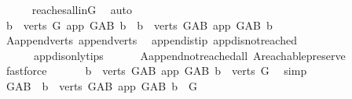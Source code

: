 \begin{isabellebody}
\ \ \ \ \isamarkupfalse%
\ reaches{\isacharunderscore}{\kern0pt}all{\isacharunderscore}{\kern0pt}in{\isacharunderscore}{\kern0pt}G\ \isamarkupfalse%
\ auto\isanewline
\ \ \isamarkupfalse%
\ \isamarkupfalse%
\ {\isachardoublequoteopen}{\isacharbraceleft}{\kern0pt}b\ {\isasymin}\ verts\ G{\isachardot}{\kern0pt}\ app\ {\isasymrightarrow}\isactrlsup {\isacharplus}{\kern0pt}\isactrlbsub G{\isacharunderscore}{\kern0pt}AB\isactrlesub \ b{\isacharbraceright}{\kern0pt}\ {\isacharequal}{\kern0pt}\ {\isacharbraceleft}{\kern0pt}b\ {\isasymin}\ verts\ G{\isacharunderscore}{\kern0pt}AB{\isachardot}{\kern0pt}\ app\ {\isasymrightarrow}\isactrlsup {\isacharplus}{\kern0pt}\isactrlbsub G{\isacharunderscore}{\kern0pt}AB\isactrlesub \ b{\isacharbraceright}{\kern0pt}{\isachardoublequoteclose}\isanewline
\ \ \ \ \isamarkupfalse%
\ A{}{\isachardot}{\kern0pt}append{\isacharunderscore}{\kern0pt}verts\ append{\isacharunderscore}{\kern0pt}verts\ \isamarkupfalse%
\ append{\isacharunderscore}{\kern0pt}is{\isacharunderscore}{\kern0pt}tip\ app{\isacharunderscore}{\kern0pt}dis{\isacharunderscore}{\kern0pt}not{\isacharunderscore}{\kern0pt}reached\isanewline
\ \ \ \ \ \ app{\isacharunderscore}{\kern0pt}dis{\isacharunderscore}{\kern0pt}only{\isacharunderscore}{\kern0pt}tips\isanewline
\ \ \ \ \ \ A{}{\isachardot}{\kern0pt}append{\isacharunderscore}{\kern0pt}not{\isacharunderscore}{\kern0pt}reached{\isacharunderscore}{\kern0pt}all\ A{}{\isachardot}{\kern0pt}reachable{}{\isacharunderscore}{\kern0pt}preserve\ \isamarkupfalse%
\ fastforce\ \isanewline
\ \ \isamarkupfalse%
\ \isamarkupfalse%
\ {\isachardoublequoteopen}{\isacharbraceleft}{\kern0pt}b\ {\isasymin}\ verts\ G{\isacharunderscore}{\kern0pt}AB{\isachardot}{\kern0pt}\ app\ {\isasymrightarrow}\isactrlsup {\isacharplus}{\kern0pt}\isactrlbsub G{\isacharunderscore}{\kern0pt}AB\isactrlesub \ b{\isacharbraceright}{\kern0pt}\ {\isacharequal}{\kern0pt}\ verts\ G{\isachardoublequoteclose}\ \isamarkupfalse%
\ simp\ \isanewline
\ \ \isamarkupfalse%
\ \isamarkupfalse%
\ {\isachardoublequoteopen}G{\isacharunderscore}{\kern0pt}AB\ {\isasymrestriction}\ {\isacharbraceleft}{\kern0pt}b\ {\isasymin}\ verts\ G{\isacharunderscore}{\kern0pt}AB{\isachardot}{\kern0pt}\ app\ {\isasymrightarrow}\isactrlsup {\isacharplus}{\kern0pt}\isactrlbsub G{\isacharunderscore}{\kern0pt}AB\isactrlesub \ b{\isacharbraceright}{\kern0pt}\ {\isacharequal}{\kern0pt}\ G{\isachardoublequoteclose}\ \isanewline

\end{isabellebody}
